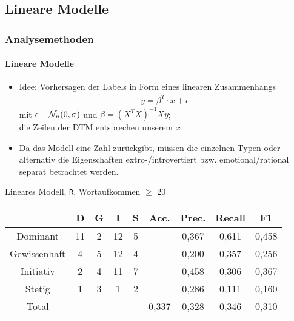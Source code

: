 \subsection{Lineare Modelle}
\begin{frame}
\frametitle{Analysemethoden}
\framesubtitle{Lineare Modelle}
\begin{itemize}\itemsep12pt
\item Idee: Vorhersagen der Labels in Form eines linearen Zusammenhangs 
\begin{align*}
y=\beta^T\cdot x+\epsilon
\end{align*}
mit $\epsilon~\raisebox{-0.9ex}{\~{ }} ~ \mathcal{N}_{n}(0,\sigma)$ und $\beta=(X^TX)^{-1}Xy$;\\
die Zeilen der DTM entsprechen unserem $x$ 
\item Da das Modell eine Zahl zurückgibt, müssen die einzelnen Typen oder alternativ die Eigenschaften extro-/introvertiert bzw. emotional/rational separat betrachtet werden.
\end{itemize}
\end{frame}

\begin{frame}
Lineares Modell, \texttt{R}, Wortaufkommen $\geq$ 20\\
\vspace{12pt}
\begin{tabular}{|c|c|c|c|c|c|c|c|c|}
\hline
				& D 	& G	& I & S	& Acc.	& Prec. & Recall	& F1\\
\hline
Dominant 		& 11	& 2 & 12& 5 &      	& 0,367 & 0,611 	& 0,458\\
Gewissenhaft 	& 4 	& 5 & 12& 4 & 		& 0,200 & 0,357 	& 0,256\\
Initiativ 		& 2 	& 4	& 11& 7	& 		& 0,458	& 0,306 	& 0,367\\
Stetig 			& 1 	& 3 & 1 & 2 & 		& 0,286	& 0,111 	& 0,160\\
\hline
Total 			& 		& 	& 	& 	& 0,337	& 0,328 & 0,346  	& 0,310\\
\hline
\end{tabular}
\end{frame}

